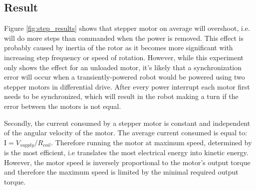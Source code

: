\subsection{Result}

Figure \ref{fig:step_results} shows that stepper motor on average will overshoot, i.e. will do more steps than commanded when the power is removed.
This effect is probably caused by inertia of the rotor as it becomes more significant with increasing step frequency or speed of rotation.
However, while this experiment only shows the effect for an unloaded motor, it's likely that a synchronization error will occur when a transiently-powered robot would be powered using two stepper motors in differential drive.
After every power interrupt each motor first needs to be synchronized, which will result in the robot making a turn if the error between the motors is not equal.

Secondly, the current consumed by a stepper motor is constant and independent of the angular velocity of the motor.
The average current consumed is equal to: $\textrm{I} = V_{supply}/R_{coil}$.
Therefore running the motor at maximum speed, determined by  is the most efficient, i.e translates the most electrical energy into kinetic energy.
However, the motor speed is inversely proportional to the motor's output torque and therefore the maximum speed is limited by the minimal required output torque.





